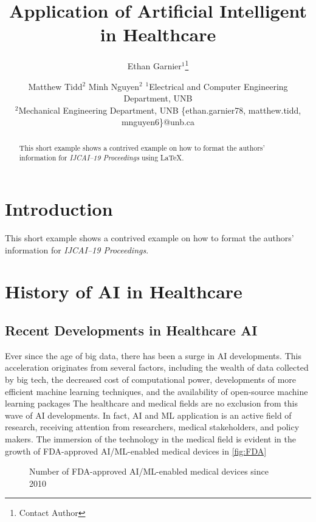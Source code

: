 \documentclass{article}
\title{Application of Artificial Intelligent in Healthcare}
\author{
Ethan Garnier$^1$\footnote{Contact Author}\and
Matthew Tidd$^2$\And
Minh Nguyen$^{2}$
\affiliations
$^1$Electrical and Computer Engineering Department, UNB\\
$^2$Mechanical Engineering Department, UNB
\emails
\{ethan.garnier78, matthew.tidd, mnguyen6\}@unb.ca
}
\begin{document}
\maketitle

\begin{abstract}
This short example shows a contrived example on how to format the authors' information for {\it IJCAI--19 Proceedings} using \LaTeX{}.
\end{abstract}

\section{Introduction}

This short example shows a contrived example on how to format the authors' information for {\it IJCAI--19 Proceedings}.
\section{History of AI in Healthcare}
\subsection{Recent Developments in Healthcare AI}
Ever since the age of big data, there has been a surge in AI developments. 
This acceleration originates from several factors, including the wealth of data collected by big tech, the decreased cost of computational power, developments of more efficient machine learning techniques, and the availability of open-source machine learning packages
The healthcare and medical fields are no exclusion from this wave of AI developments. 
In fact, AI and ML application is an active field of research, receiving attention from researchers, medical stakeholders, and policy makers.
The immersion of the technology in the medical field is evident in the growth of FDA-approved AI/ML-enabled medical devices in \autoref{fig:FDA}

\begin{figure}[htbp]
    \caption{Number of FDA-approved AI/ML-enabled medical devices since 2010} 
    \label{fig:FDA}
\end{figure}
\end{document}
